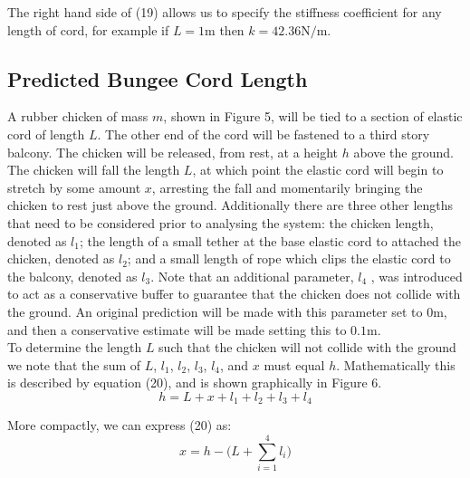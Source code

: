 \documentclass[a4paper]{article}
\begin{document}
The right hand side of (19) allows us to specify the stiffness coefficient for any length of cord, for example if $L = 1\si{\meter}$ then $k = 42.36 \si{\newton\per\meter}$.

\newpage

\subsection{Predicted Bungee Cord Length}
A rubber chicken of mass $m$, shown in Figure 5, will be tied to a section of elastic cord of length $L$. The other end of the cord will be fastened to a third story balcony. The chicken will be released, from rest, at a height $h$ above the ground. The chicken will fall the length $L$, at which point the elastic cord will begin to stretch by some amount $x$, arresting the fall and momentarily bringing the chicken to rest just above the ground. Additionally there are three other lengths that need to be considered prior to analysing the system: the chicken length, denoted as $l_1$; the length of a small tether at the base elastic cord to attached the chicken, denoted as $l_2$; and a small length of rope which clips the elastic cord to the balcony, denoted as $l_3$. Note that an additional parameter, $l_4$ , was introduced to act as a conservative buffer to guarantee that the chicken does not collide with the ground. An original prediction will be made with this parameter set to $0\si{\meter}$, and then a conservative estimate will be made setting this to $0.1\si{\meter}$. \\

To determine the length $L$ such that the chicken will not collide with the ground we note that the sum of $L$, $l_1$, $l_2$, $l_3$, $l_4$, and $x$ must equal $h$. Mathematically this is described by equation (20), and is shown graphically in Figure 6.
\begin{equation}
h = L + x + l_1 + l_2 + l_3 + l_4
\end{equation}

More compactly, we can express (20) as:
\begin{equation}
x = h - \bigg(L + \sum_{i=1}^{4} l_i \bigg)
\end{equation}
\end{document}
